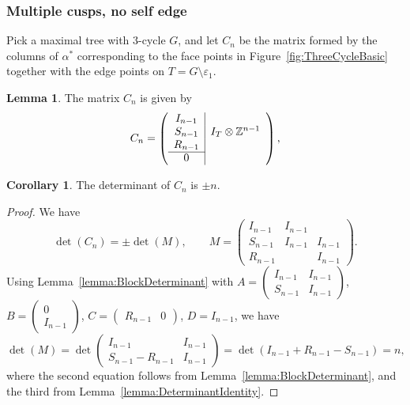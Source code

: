 \documentclass[12pt]{amsart}
\theoremstyle{definition}
\newtheorem{lemma}[theorem]{Lemma}
\newtheorem{corollary}[theorem]{Corollary}
\numberwithin{equation}{section}
\def\S{\Sigma}
\def\R{\mathbb{R}}
\def\Z{\mathbb{Z}}
\begin{document}
\subsubsection{Multiple cusps, no self edge}
Pick a maximal tree with $3$-cycle $G$, and let $C_n$ be the matrix formed by the columns of $\alpha^*$ corresponding to the face points in Figure~\ref{fig:ThreeCycleBasic} together with the edge points on $T=G\setminus\varepsilon_1$.
\begin{lemma}
The matrix $C_n$ is given by
\begin{equation}
C_n=\left(\begin{array}{c|c}
I_{n-1}& \\
S_{n-1}&I_T\otimes\Z^{n-1}\\
R_{n-1}&\\\cline{1-1}
 0 &
\end{array}\right),
\end{equation}
\end{lemma}
\begin{corollary}
The determinant of $C_n$ is $\pm n$.
\end{corollary}
\begin{proof}
We have
\begin{equation}
\det(C_n)=\pm\det(M),\qquad M=\begin{pmatrix}I_{n-1}&I_{n-1}&\\S_{n-1}&I_{n-1}&I_{n-1}\\R_{n-1}&&I_{n-1}\end{pmatrix}.
\end{equation}
Using Lemma~\ref{lemma:BlockDeterminant} with $A=\left(\begin{smallmatrix}I_{n-1}&I_{n-1}\\S_{n-1}&I_{n-1}\end{smallmatrix}\right)$, $B=\left(\begin{smallmatrix}0\\I_{n-1}\end{smallmatrix}\right)$, $C=\left(\begin{smallmatrix}R_{n-1}&0\end{smallmatrix}\right)$, $D=I_{n-1}$, we have
\begin{equation}
\det(M)=\det\begin{pmatrix}I_{n-1}&I_{n-1}\\S_{n-1}-R_{n-1}&I_{n-1}\end{pmatrix}=\det(I_{n-1}+R_{n-1}-S_{n-1})=n,
\end{equation}
where the second equation follows from Lemma~\ref{lemma:BlockDeterminant}, and the third from Lemma~\ref{lemma:DeterminantIdentity}.
\end{proof}
\end{document}
